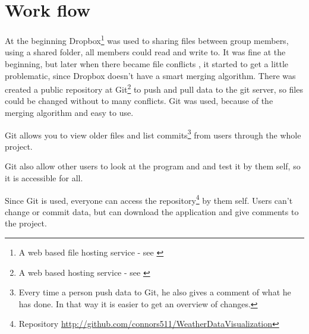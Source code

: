 \chapter{Work flow}
At the beginning Dropbox\footnote{A web based file hosting service - see \cite{Dropbox}} was used to sharing files between group members, using a shared folder, all members could read and write to. It was fine at the beginning, but later when there became file conflicts , it started to get a little problematic, since Dropbox doesn't have a smart merging algorithm.
There was created a public repository at Git\footnote{A web based hosting service - see \cite{Git}} to push and pull data to the git server, so files could be changed without to many conflicts. Git was used, because of the merging algorithm and easy to use.

Git allows you to view older files and list commits\footnote{Every time a person push data to Git, he also gives a comment of what he has done. In that way it is easier to get an overview of changes.} from users through the whole project.

Git also allow other users to look at the program and and test it by them self, so it is accessible for all.

Since Git is used, everyone can access the repository\footnote{Repository \url{http://github.com/connors511/WeatherDataVisualization}} by them self. Users can't change or commit data, but can download the application and give comments to the project.